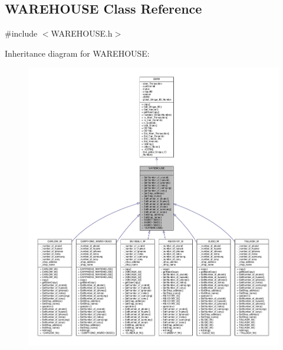 \hypertarget{class_w_a_r_e_h_o_u_s_e}{}\subsection{W\+A\+R\+E\+H\+O\+U\+SE Class Reference}
\label{class_w_a_r_e_h_o_u_s_e}


{\ttfamily \#include $<$W\+A\+R\+E\+H\+O\+U\+S\+E.\+h$>$}



Inheritance diagram for W\+A\+R\+E\+H\+O\+U\+SE\+:\nopagebreak
\begin{figure}[H]
\begin{center}
\leavevmode
\includegraphics[width=350pt]{class_w_a_r_e_h_o_u_s_e__inherit__graph}
\end{center}
\end{figure}



